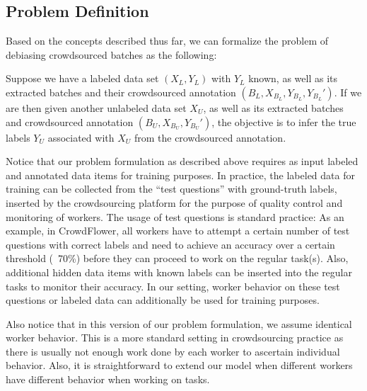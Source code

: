 
\subsection{Problem Definition}

Based on the concepts described thus far, 
we can formalize the problem of debiasing crowdsourced batches as the following:

\begin{problem} 
Suppose we have a labeled data set $(X_L, Y_L)$ with $Y_L$ known, 
as well as its extracted batches and their crowdsourced annotation $(B_L, X_{B_L}, Y_{B_L}, Y_{B_L}')$.  
If we are then given another unlabeled data set $X_U$, 
as well as its extracted batches and crowdsourced annotation $(B_U, X_{B_U}, Y_{B_U}')$, 
the objective is to infer the true labels $Y_{U}$ associated with $X_{U}$ from the crowdsourced annotation.  
\end{problem}
Notice that our problem formulation as described above requires
as input labeled and annotated data items for training purposes. 
In practice, the labeled data for training 
can be collected from the ``test questions'' 
with ground-truth labels, 
inserted by the crowdsourcing platform for the 
purpose of quality control and monitoring
of workers.  
The usage of test questions is standard practice: 
As an example, in CrowdFlower, all workers have to attempt a 
certain number of test questions with correct labels 
and need to achieve an accuracy over a certain threshold (\eg~70\%) 
before they can proceed to work on the regular task(s).  
Also, additional hidden data items with known labels 
can be inserted into the regular tasks
to monitor their accuracy.  
In our setting, worker behavior on these
test questions or labeled data can additionally be used
for training purposes.


Also notice that in this version of our problem
formulation, we assume identical worker behavior.  
This is a more standard setting in crowdsourcing practice 
as there is usually not enough work done by each worker to ascertain individual behavior.
Also, it is straightforward to extend our model when 
different workers have different behavior when working on tasks.



